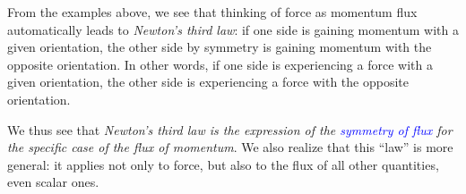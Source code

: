 \documentclass[a4paper,12pt,%
onecolumn,oneside,%
british%
]{memoir}
\newcommand{\langnohyph}[1]{\begin{hyphenrules}{nohyphenation}#1\end{hyphenrules}}
\newcommand*{\amp}{\&}
\renewcommand*{\|}[1][]{\nonscript\:#1\vert\nonscript\:\mathopen{}}
\newcommand*{\sect}{\S}%
\renewcommand*{\autoref}[2]{\sidepar{\vspace{-1ex}\footnotesize{\color{blue}\faIcon{%
angle-right%
}\enspace\sect~\ref{#1} page~\pageref{#1}}}\textcolor{blue}{#2}}
\begin{document}
%
%
From the examples above, we see that thinking of force as momentum flux automatically leads to \emph{Newton's third law}: if one side is gaining momentum with a given orientation, the other side by symmetry is gaining momentum with the opposite orientation. In other words, if one side is experiencing a force with a given orientation, the other side is experiencing a force with the opposite orientation.

We thus see that \emph{Newton's third law is the expression of the \autoref{def:symmetryflux}{symmetry of flux} for the specific case of the flux of momentum}. We also realize that this \enquote{law} is more general: it applies not only to force, but also to the flux of all other quantities, even scalar ones.

% 
\end{document}
